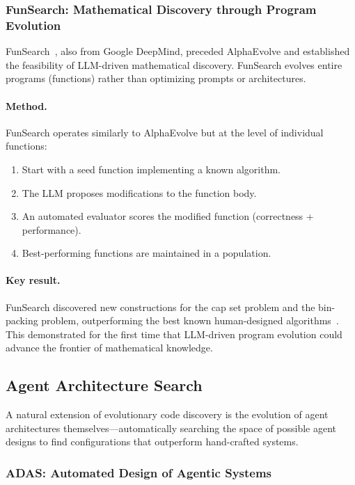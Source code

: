 \subsubsection{FunSearch: Mathematical Discovery through Program Evolution}
\label{sec:funsearch}

FunSearch~\citep{romeraparedes2023funsearch}, also from Google DeepMind, preceded AlphaEvolve and established the feasibility of LLM-driven mathematical discovery. FunSearch evolves entire programs (functions) rather than optimizing prompts or architectures.

\paragraph{Method.}
FunSearch operates similarly to AlphaEvolve but at the level of individual functions:
\begin{enumerate}
    \item Start with a seed function implementing a known algorithm.
    \item The LLM proposes modifications to the function body.
    \item An automated evaluator scores the modified function (correctness + performance).
    \item Best-performing functions are maintained in a population.
\end{enumerate}

\paragraph{Key result.}
FunSearch discovered new constructions for the cap set problem and the bin-packing problem, outperforming the best known human-designed algorithms~\citep{romeraparedes2023funsearch}. This demonstrated for the first time that LLM-driven program evolution could advance the frontier of mathematical knowledge.

\subsection{Agent Architecture Search}
\label{sec:agent-architecture-search}

A natural extension of evolutionary code discovery is the evolution of agent architectures themselves---automatically searching the space of possible agent designs to find configurations that outperform hand-crafted systems.

\subsubsection{ADAS: Automated Design of Agentic Systems}
\label{sec:adas-detail}

